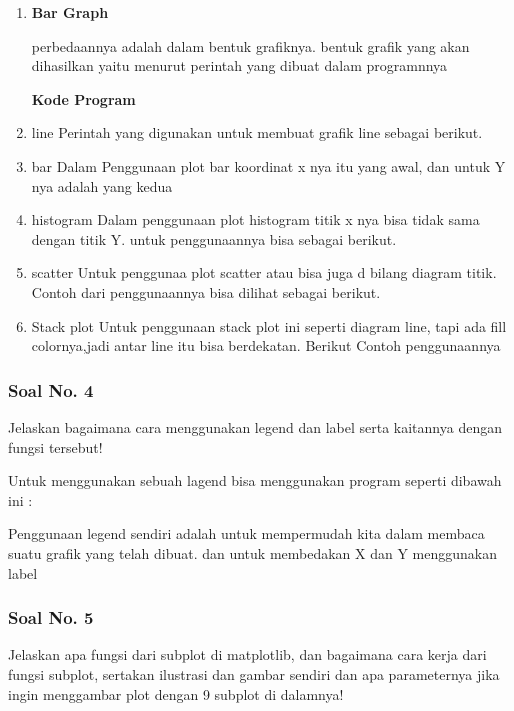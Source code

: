 \begin{enumerate}
	\item \textbf{Bar Graph}
	
	perbedaannya adalah dalam bentuk grafiknya. bentuk grafik yang akan dihasilkan yaitu menurut perintah yang dibuat dalam programnnya
	
	\textbf{Kode Program}
	
    \item line
    Perintah yang digunakan untuk membuat grafik line sebagai berikut.
    
    \item bar
    Dalam Penggunaan plot bar koordinat x nya itu yang awal, dan untuk Y nya adalah yang kedua
    
    \item histogram
    Dalam penggunaan plot histogram titik x nya bisa tidak sama dengan titik Y.
    untuk penggunaannya bisa sebagai berikut.
    
    \item scatter
    Untuk penggunaa plot scatter atau bisa juga d bilang diagram titik.
    Contoh dari penggunaannya bisa dilihat sebagai berikut.
    
    \item Stack plot
    Untuk penggunaan stack plot ini seperti diagram line, tapi ada fill colornya,jadi antar line itu bisa berdekatan.
    Berikut Contoh penggunaannya
    
	
\end{enumerate}

\subsubsection{Soal No. 4}
\hfill \break
Jelaskan bagaimana cara menggunakan legend dan label serta kaitannya dengan fungsi tersebut!

\hfill \break
Untuk menggunakan sebuah lagend bisa menggunakan program seperti dibawah ini :

Penggunaan legend sendiri adalah untuk mempermudah kita dalam membaca suatu grafik yang telah dibuat.
dan untuk membedakan X dan Y menggunakan label

\subsubsection{Soal No. 5}
\hfill \break
Jelaskan apa fungsi dari subplot di matplotlib, dan bagaimana cara kerja dari fungsi subplot, sertakan ilustrasi dan gambar sendiri dan apa parameternya jika ingin menggambar plot dengan 9 subplot di dalamnya!

